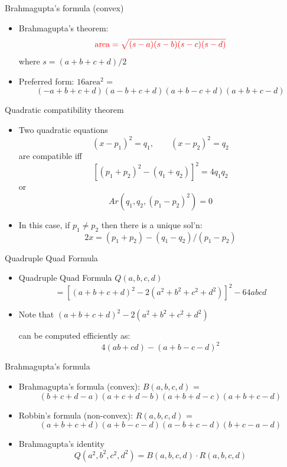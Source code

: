 \documentclass[10pt,ignorenonframetext,serif,onlymath]{beamer}
\begin{document}
\begin{frame}{Brahmagupta’s formula (convex)}
\protect\hypertarget{sec:brahmaguptas-formula-convex}{}

\begin{itemize}
\item
  Brahmagupta’s theorem:
  \[\color{red}{\text{area} = \sqrt{(s - a) (s - b) (s - c) (s - d)}}\]
  where \(s = (a + b + c + d)/2\)
\item
  Preferred form: \(16\text{area}^2\) =
  \[(-a + b + c + d)(a - b + c + d)
    (a + b - c + d)(a + b + c - d)\]
\end{itemize}

\end{frame}

\begin{frame}{Quadratic compatibility theorem}
\protect\hypertarget{sec:quadratic-compatibility-theorem}{}

\begin{itemize}
\item
  Two quadratic equations
  \[(x - p_1)^2 = q_1, \qquad (x - p_2)^2 = q_2\] are compatible iff
  \[[(p_1 + p_2)^2 - (q_1 + q_2)]^2 = 4 q_1 q_2\] or
  \[Ar(q_1, q_2, (p_1 - p_2)^2) = 0\]
\item
  In this case, if \(p_1 \neq p_2\) then there is a unique sol’n:
  \[2 x = (p_1 + p_2) - (q_1 - q_2)/(p_1 - p_2)\]
\end{itemize}

\end{frame}

\begin{frame}{Quadruple Quad Formula}
\protect\hypertarget{sec:quadruple-quad-formula}{}

\begin{itemize}
\item
  Quadruple Quad Formula \(Q(a,b,c,d)\)
  \[= [(a+b+c+d)^2 - 2(a^2 + b^2 + c^2 + d^2)]^2 - 64 a b c d\]
\item
  Note that \((a+b+c+d)^2 - 2(a^2 + b^2 + c^2 + d^2)\)

  can be computed efficiently as: \[4(ab + cd) - (a + b - c - d)^2\]
\end{itemize}

\end{frame}

\begin{frame}{Brahmagupta’s formula}
\protect\hypertarget{sec:brahmaguptas-formula}{}

\begin{itemize}
\item
  Brahmagupta’s formula (convex): \(B(a,b,c,d)\) =
  \[(b + c + d - a)(a + c + d - b)(a + b + d - c)(a + b + c - d) \]
\item
  Robbin’s formula (non-convex): \(R(a,b,c,d)\) =\\
  \[(a + b + c + d)(a + b - c - d)(a - b + c - d)(b + c - a - d) \]
\item
  Brahmagupta’s identity
  \[Q(a^2,b^2,c^2,d^2) = B(a,b,c,d) \cdot R(a,b,c,d)\]
\end{itemize}

\end{frame}
\end{document}
